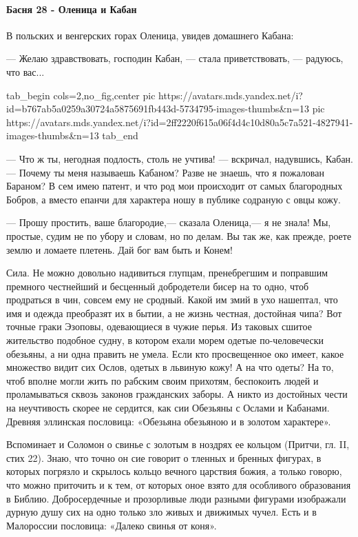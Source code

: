  
 
 
 
 

\paragraph{Басня 28 - Оленица и Кабан}
\label{sec:moje.kremlevskie_narrativy.jazyk.olenica_i_kaban}

В польских и венгерских горах Оленица, увидев домашнего Кабана:

— Желаю здравствовать, господин Кабан, — стала приветствовать, — радуюсь, что
вас...

\ifcmt
  tab_begin cols=2,no_fig,center
     pic https://avatars.mds.yandex.net/i?id=b767ab5a0259a30724a5875691fb443d-5734795-images-thumbs&n=13
		 pic https://avatars.mds.yandex.net/i?id=2ff2220f615a06f4d4c10d80a5c7a521-4827941-images-thumbs&n=13
  tab_end
\fi

— Что ж ты, негодная подлость, столь не учтива! — вскричал, надувшись, Кабан.—
Почему ты меня называешь Кабаном? Разве не знаешь, что я пожалован Бараном? В
сем имею патент, и что род мои происходит от самых благородных Бобров, а вместо
епанчи для характера ношу в публике содраную с овцы кожу.

— Прошу простить, ваше благородие,— сказала Оленица,— я не знала! Мы, простые,
судим не по убору и словам, но по делам. Вы так же, как прежде, роете землю и
ломаете плетень. Дай бог вам быть и Конем!

Сила. Не можно довольно надивиться глупцам, пренебрегшим и поправшим премного
честнейший и бесценный добродетели бисер на то одно, чтоб продраться в чин,
совсем ему не сродный. Какой им змий в ухо нашептал, что имя и одежда
преобразят их в бытии, а не жизнь честная, достойная чипа? Вот точные граки
Эзоповы, одевающиеся в чужие перья. Из таковых сшитое жительство подобное
судну, в котором ехали морем одетые по-человечески обезьяны, а ни одна править
не умела. Если кто просвещенное око имеет, какое множество видит сих Ослов,
одетых в львиную кожу! А на что одеты? На то, чтоб вполне могли жить по рабским
своим прихотям, беспокоить людей и проламываться сквозь законов гражданских
заборы. А никто из достойных чести на неучтивость скорее не сердится, как сии
Обезьяны с Ослами и Кабанами. Древняя эллинская пословица: «Обезьяна обезьяною
и в золотом характере».

Вспоминает и Соломон о свинье с золотым в ноздрях ее кольцом (Притчи, гл. II,
стих 22). Знаю, что точно он сие говорит о тленных и бренных фигурах, в которых
погрязло и скрылось кольцо вечного царствия божия, а только говорю, что можно
приточить и к тем, от которых оное взято для особливого образования в Библию.
Добросердечные и прозорливые люди разными фигурами изображали дурную душу сих
на одно только зло живых и движимых чучел. Есть и в Малороссии пословица:
«Далеко свинья от коня». 


